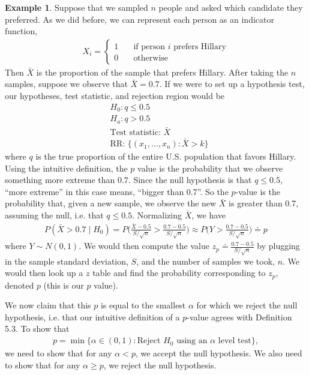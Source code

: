 \documentclass[11pt,letterpaper]{article}
\numberwithin{theorem}{section}
\numberwithin{definition}{section}
\numberwithin{lemma}{section}
\numberwithin{corollary}{section}
\numberwithin{proposition}{section}
\theoremstyle{definition}
\numberwithin{remark}{section}
\numberwithin{claim}{section}
\numberwithin{observation}{section}
\numberwithin{fact}{section}
\numberwithin{assumption}{section}
\newtheorem{example}[theorem]{Example}
\numberwithin{example}{section}
\numberwithin{exercise}{section}
\begin{document}
\begin{example}
Suppose that we sampled $n$ people and asked which candidate they preferred. As we did before, we can represent each person as an indicator function, 
\begin{align*}
X_i = \begin{cases}
1 \hspace{1em} &\text{if person $i$ prefers Hillary} \\
0 &\text{otherwise}
\end{cases}
\end{align*}
Then $\bar{X}$ is the proportion of the sample that prefers Hillary. After taking the $n$ samples, suppose we observe that $\bar{X} = 0.7$. If we were to set up a hypothesis test, our hypotheses, test statistic, and rejection region would be
\begin{align*}
&H_0: q \leq 0.5 \\
&H_a: q > 0.5 \\
&\text{Test statistic: } \bar{X} \\
&\text{RR: } \{(x_1,\dots,x_n) : \bar{X} > k\}
\end{align*}
where $q$ is the true proportion of the entire U.S. population that favors Hillary. Using the intuitive definition, the $p$ value is the probability that we observe something more extreme than $0.7$. Since the null hypothesis is that $q \leq 0.5$, ``more extreme'' in this case means, ``bigger than 0.7''. So the $p$-value is the probability that, given a new sample, we observe the new $\bar{X}$ is greater than 0.7, assuming the null, i.e. that $q \leq 0.5$. Normalizing $\bar{X}$, we have
\begin{align}
P(\bar{X} > 0.7 \mid H_0) = P\Big(\frac{\bar{X} - 0.5}{S/\sqrt{n}} > \frac{0.7 - 0.5}{S/\sqrt{n}}\Big) \approx P\Big(Y > \frac{0.7 - 0.5}{S/\sqrt{n}} \Big) \doteq p
\end{align}
where $Y \sim N(0,1)$. We would then compute the value $z_p \doteq\frac{0.7 - 0.5}{S/\sqrt{n}}$ by plugging in the sample standard deviation, $S$, and the number of samples we took, $n$. We would then look up a $z$ table and find the probability corresponding to $z_{p}$, denoted $p$ (this is our $p$ value).

We now claim that this $p$ is equal to the smallest $\alpha$ for which we reject the null hypothesis, i.e. that our intuitive definition of a $p$-value agrees with Definition 5.3. To show that 
\begin{align*}
p = \min \{\alpha \in (0,1): \text{Reject $H_0$ using an $\alpha$ level test}\},
\end{align*}
we need to show that for any $\alpha < p$, we accept the null hypothesis. We also need to show that for any $\alpha \geq p$, we reject the null hypothesis.


\end{example}
\end{document}
